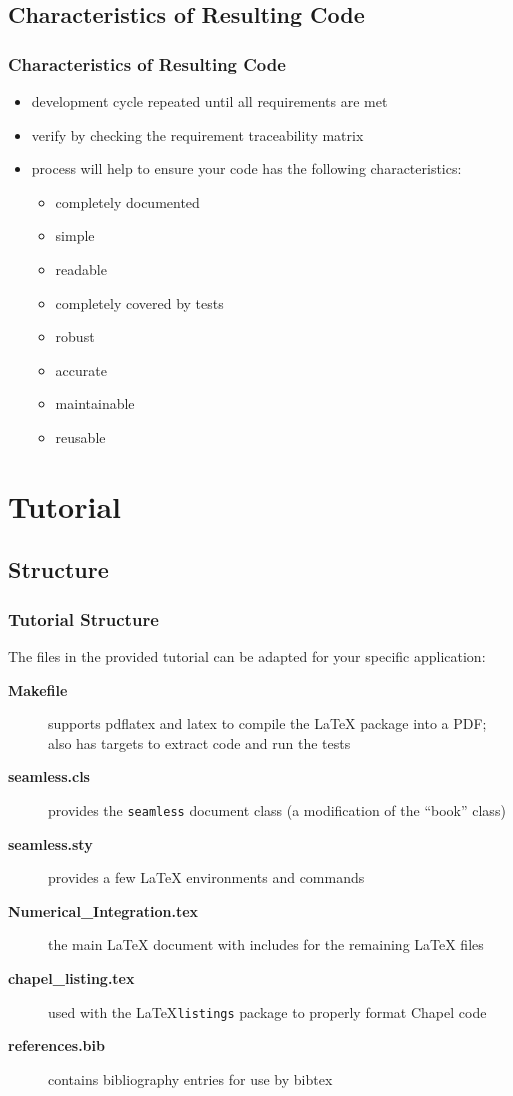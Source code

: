 \documentclass{beamer}
\makeatletter
\newcommand*{\seamless}{\texttt{seamless}\@\xspace}
\newcommand*{\latex}{\LaTeX\@\xspace}
\makeatother
\begin{document}
\subsection{Characteristics of Resulting Code}
\begin{frame}
  \frametitle{Characteristics of Resulting Code}
  \begin{itemize}
    \item development cycle repeated until all requirements are met
    \item verify by checking the requirement traceability matrix
    \item process will help to ensure your code has the following characteristics:
      \begin{itemize}
        \item completely documented
        \item simple
        \item readable
        \item completely covered by tests
        \item robust
        \item accurate
        \item maintainable
        \item reusable
      \end{itemize}
  \end{itemize}
\end{frame}

\section{Tutorial}
\subsection{Structure}
\begin{frame}
  \frametitle{Tutorial Structure}
  The files in the provided tutorial can be adapted for your specific application:
  \begin{description}
    \item[\bf Makefile] supports pdflatex and latex to compile the LaTeX package into a
      PDF; also has targets to extract code and run the tests 
    \item[\bf seamless.cls] provides the \seamless document class (a modification of the ``book'' class)
    \item[\bf seamless.sty] provides a few \latex environments and commands 
    \item[\bf Numerical\_Integration.tex] the main \latex document with includes for the remaining LaTeX files 
    \item[\bf chapel\_listing.tex] used with the \latex \texttt{listings} package to properly format Chapel code
    \item[\bf references.bib] contains bibliography entries for use by bibtex
  \end{description}
\end{frame}
\end{document}
